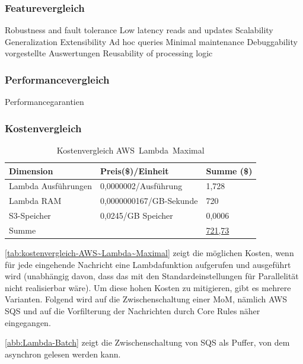 \subsubsection{Featurevergleich} 
Robustness and fault tolerance
Low latency reads and updates
Scalability
Generalization
Extensibility
Ad hoc queries
Minimal maintenance
Debuggability
vorgestellte Auswertungen 
Reusability of processing logic

\subsubsection{Performancevergleich}
Performancegarantien

\subsubsection{Kostenvergleich}
\begin{table}[H]
\centering
\begin{tabular}{|l|l|l|}
\hline
Dimension & Preis(\$)/Einheit & Summe (\$) \\ \hline
Lambda Ausführungen & 0,0000002/Ausführung & 1,728 \\ \hline
Lambda \ac{RAM} & 0,0000000167/GB-Sekunde & 720 \\ \hline
\ac{S3}-Speicher & 0,0245/GB Speicher & 0,0006 \\ \hline
Summe & \cellcolor[HTML]{EFEFEF} & \underline{721,73} \\ \hline
\end{tabular}
\caption{Kostenvergleich AWS~Lambda~Maximal}
\label{tab:kostenvergleich-AWS~Lambda~Maximal}
\end{table}

\autoref{tab:kostenvergleich-AWS~Lambda~Maximal} zeigt die möglichen Kosten, wenn für jede eingehende Nachricht eine Lambdafunktion aufgerufen und ausgeführt wird (unabhängig davon, dass das mit den Standardeinstellungen für Parallelität nicht realisierbar wäre). Um diese hohen Kosten zu mitigieren, gibt es mehrere Varianten. Folgend wird auf die Zwischenschaltung einer \ac{MoM}, nämlich \ac{AWS} \ac{SQS} und auf die Vorfilterung der Nachrichten durch \AWSIOT{} Core Rules näher eingegangen.

\autoref{abb:Lambda-Batch} zeigt die Zwischenschaltung von \ac{SQS} als Puffer, von dem asynchron gelesen werden kann.

